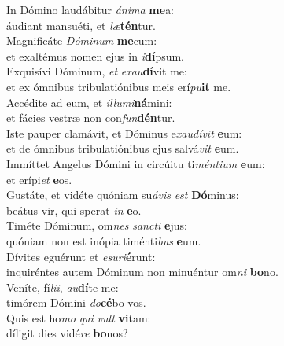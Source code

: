 \evenverse In Dómino laudábitur \textit{á}\textit{ni}\textit{ma} \textbf{me}a:~\*\\
\evenverse áudiant mansuéti, et \textit{læ}\textbf{tén}tur.\\
\oddverse Magnificáte \textit{Dó}\textit{mi}\textit{num} \textbf{me}cum:~\*\\
\oddverse et exaltémus nomen ejus in \textit{i}\textbf{dí}psum.\\
\evenverse Exquisívi Dóminum, \textit{et} \textit{e}\textit{xau}\textbf{dí}vit me:~\*\\
\evenverse et ex ómnibus tribulatiónibus meis erí\textit{pu}\textbf{it} me.\\
\oddverse Accédite ad eum, et \textit{il}\textit{lu}\textit{mi}\textbf{ná}mini:~\*\\
\oddverse et fácies vestræ non con\textit{fun}\textbf{dén}tur.\\
\evenverse Iste pauper clamávit, et Dóminus e\textit{xau}\textit{dí}\textit{vit} \textbf{e}um:~\*\\
\evenverse et de ómnibus tribulatiónibus ejus salvá\textit{vit} \textbf{e}um.\\
\oddverse Immíttet Angelus Dómini in circúitu ti\textit{mén}\textit{ti}\textit{um} \textbf{e}um:~\*\\
\oddverse et erípi\textit{et} \textbf{e}os.\\
\evenverse Gustáte, et vidéte quóniam su\textit{á}\textit{vis} \textit{est} \textbf{Dó}minus:~\*\\
\evenverse beátus vir, qui sperat \textit{in} \textbf{e}o.\\
\oddverse Timéte Dóminum, om\textit{nes} \textit{san}\textit{cti} \textbf{e}jus:~\*\\
\oddverse quóniam non est inópia timénti\textit{bus} \textbf{e}um.\\
\evenverse Dívites eguérunt et \textit{e}\textit{su}\textit{ri}\textbf{é}runt:~\*\\
\evenverse inquiréntes autem Dóminum non minuéntur om\textit{ni} \textbf{bo}no.\\
\oddverse Veníte, fí\textit{li}\textit{i}, \textit{au}\textbf{dí}te me:~\*\\
\oddverse timórem Dómini \textit{do}\textbf{cé}bo vos.\\
\evenverse Quis est ho\textit{mo} \textit{qui} \textit{vult} \textbf{vi}tam:~\*\\
\evenverse díligit dies vidé\textit{re} \textbf{bo}nos?\\
